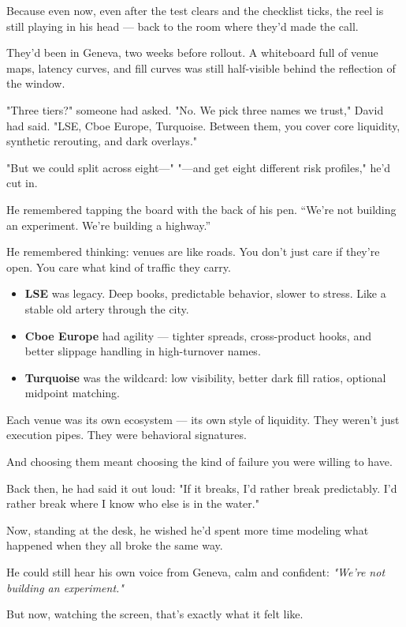 Because even now, even after the test clears and the checklist ticks, the reel is still playing in his head — 
back to the room where they’d made the call.

They’d been in Geneva, two weeks before rollout. A whiteboard full of venue maps, latency curves, and fill 
curves was still half-visible behind the reflection of the window.

"Three tiers?" someone had asked.
"No. We pick three names we trust," David had said.
"LSE, Cboe Europe, Turquoise. Between them, you cover core liquidity, synthetic rerouting, and dark overlays."

"But we could split across eight—"
"—and get eight different risk profiles," he’d cut in.

He remembered tapping the board with the back of his pen.
“We’re not building an experiment. We’re building a highway.”

He remembered thinking: venues are like roads.
You don’t just care if they’re open. You care what kind of traffic they carry.

\begin{itemize}
\item \textbf{LSE} was legacy. Deep books, predictable behavior, slower to stress. Like a stable old artery through the city.
\item \textbf{Cboe Europe} had agility — tighter spreads, cross-product hooks, and better slippage handling in high-turnover names.
\item \textbf{Turquoise} was the wildcard: low visibility, better dark fill ratios, optional midpoint matching.
\end{itemize}

Each venue was its own ecosystem — its own style of liquidity.
They weren’t just execution pipes. They were behavioral signatures.

And choosing them meant choosing the kind of failure you were willing to have.

Back then, he had said it out loud:
"If it breaks, I’d rather break predictably. I’d rather break where I know who else is in the water."

Now, standing at the desk, he wished he’d spent more time modeling what happened when they all broke the same way.

He could still hear his own voice from Geneva, calm and confident:
\textit{"We’re not building an experiment."}

But now, watching the screen, that’s exactly what it felt like.

